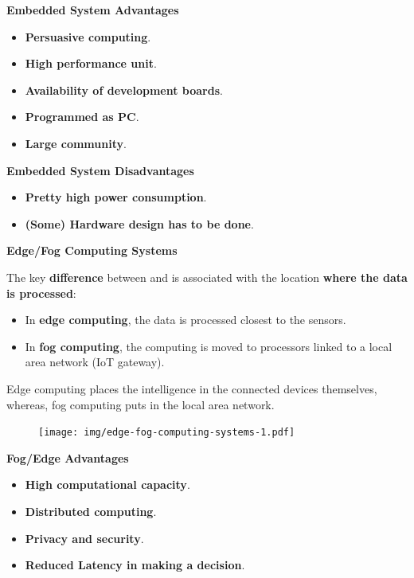 \begin{flushleft}
    \textcolor{Green3}{ \textbf{Embedded System Advantages}}
\end{flushleft}
\begin{itemize}
    \item \textbf{Persuasive computing}.
    \item \textbf{High performance unit}.
    \item \textbf{Availability of development boards}.
    \item \textbf{Programmed as PC}.
    \item \textbf{Large community}.
\end{itemize}

\begin{flushleft}
    \textcolor{Red2}{ \textbf{Embedded System Disadvantages}}
\end{flushleft}
\begin{itemize}
    \item \textbf{Pretty high power consumption}.
    \item \textbf{(Some) Hardware design has to be done}.
\end{itemize}

\newpage

\begin{center}
    \large
    \textcolor{Red3}{\textbf{Edge/Fog Computing Systems}}
\end{center}

\noindent
The key \textbf{difference} between  and  is associated with the location \textbf{where the data is processed}:
\begin{itemize}
    \item In \textbf{edge computing}, the data is processed closest to the sensors.

    \item In \textbf{fog computing}, the computing is moved to processors linked to a local area network (IoT gateway).
\end{itemize}
Edge computing places the intelligence in the connected devices themselves, whereas, fog computing puts in the local area network.

\begin{figure}[!htp]
    \centering
    \texttt{[image: img/edge-fog-computing-systems-1.pdf]}
\end{figure}

\begin{flushleft}
    \textcolor{Green3}{ \textbf{Fog/Edge Advantages}}
\end{flushleft}
\begin{itemize}
    \item \textbf{High computational capacity}.
    \item \textbf{Distributed computing}.
    \item \textbf{Privacy and security}.
    \item \textbf{Reduced Latency in making a decision}.
\end{itemize}


